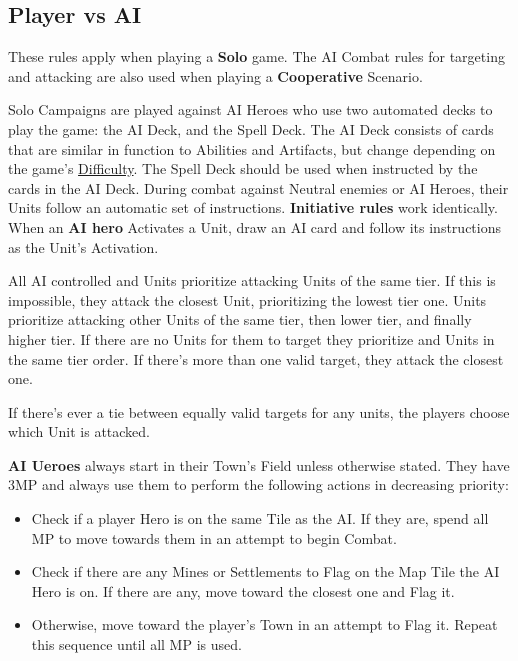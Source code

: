 \begin{multicols}{2}
\subsection*{\hypertarget{AIrules}{Player vs AI}}
These rules apply when playing a \textbf{Solo} game.
The AI Combat rules for targeting and attacking are also used when playing a \textbf{Cooperative} Scenario.\par
Solo Campaigns are played against AI Heroes who use two automated decks to play the game: the AI Deck, and the Spell Deck.
The AI Deck consists of cards that are similar in function to Abilities and Artifacts, but change depending on the game's \hyperlink{Difficulty}{Difficulty}.
The Spell Deck should be used when instructed by the cards in the AI Deck.
During combat against Neutral enemies or AI Heroes, their Units follow an automatic set of instructions.
\textbf{Initiative rules} work identically.
When an \textbf{AI hero} Activates a Unit, draw an AI card and follow its instructions as the Unit's Activation.\par
All AI controlled  and  Units prioritize attacking Units of the same tier.
If this is impossible, they attack the closest Unit, prioritizing the lowest tier one.
 Units prioritize attacking other  Units of the same tier, then lower tier, and finally higher tier.
If there are no  Units for them to target they prioritize  and  Units in the same tier order.
If there's more than one valid target, they attack the closest one.\par
If there's ever a tie between equally valid targets for any units, the players choose which Unit is attacked.

\textbf{AI Ueroes} always start in their Town's Field unless otherwise stated.
They have 3MP and always use them to perform the following actions in decreasing priority:
\begin{itemize}
  \item Check if a player Hero is on the same Tile as the AI.
    If they are, spend all MP to move towards them in an attempt to begin Combat.
  \item Check if there are any Mines or Settlements to Flag on the Map Tile the AI Hero is on.
    If there are any, move toward the closest one and Flag it.
  \item Otherwise, move toward the player's Town in an attempt to Flag it.
Repeat this sequence until all MP is used.
\end{itemize}


\end{multicols}
